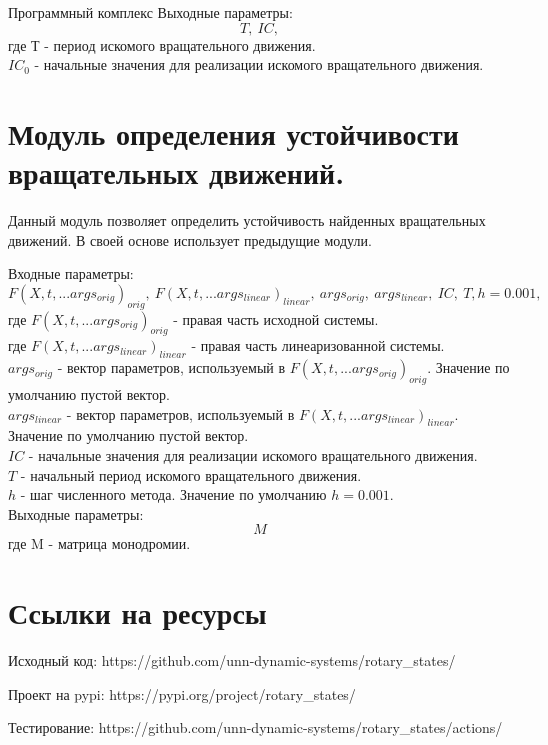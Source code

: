 \begin{chapter}{Программный комплекс}
Выходные параметры: $$T,  \ IC,$$
где $\text{Т}$ - период искомого вращательного движения. \\
$IC_0$ - начальные значения для реализации искомого вращательного движения. \\


\section{Модуль определения устойчивости вращательных движений.}
Данный модуль позволяет определить устойчивость найденных вращательных движений.
В своей основе использует предыдущие модули.

Входные параметры: $$F(X, t, ...args_{orig})_{orig}, \ F(X, t, ...args_{linear})_{linear}, \ args_{orig}, \ args_{linear}, \ IC, \ T , h=0.001,$$
где $F(X, t, ...args_{orig})_{orig}$ - правая часть исходной системы. \\
где $F(X, t, ...args_{linear})_{linear}$ - правая часть линеаризованной  системы. \\
$args_{orig}$ - вектор параметров, используемый в $F(X, t, ...args_{orig})_{orig}$. Значение по умолчанию пустой вектор. \\ 
$args_{linear}$ - вектор параметров, используемый в $F(X, t, ...args_{linear})_{linear}$. Значение по умолчанию пустой вектор. \\
$IC$ - начальные значения для реализации искомого вращательного движения.\\
$T$ - начальный период искомого вращательного движения.\\
$h$ - шаг численного метода. Значение по умолчанию $h = 0.001$. \\

Выходные параметры: $$M$$
где $\text{M}$ - матрица монодромии.

\section{Ссылки на ресурсы}
Исходный код: https://github.com/unn-dynamic-systems/rotary\_states/

Проект на pypi: https://pypi.org/project/rotary\_states/

Тестирование: https://github.com/unn-dynamic-systems/rotary\_states/actions/

\end{chapter}